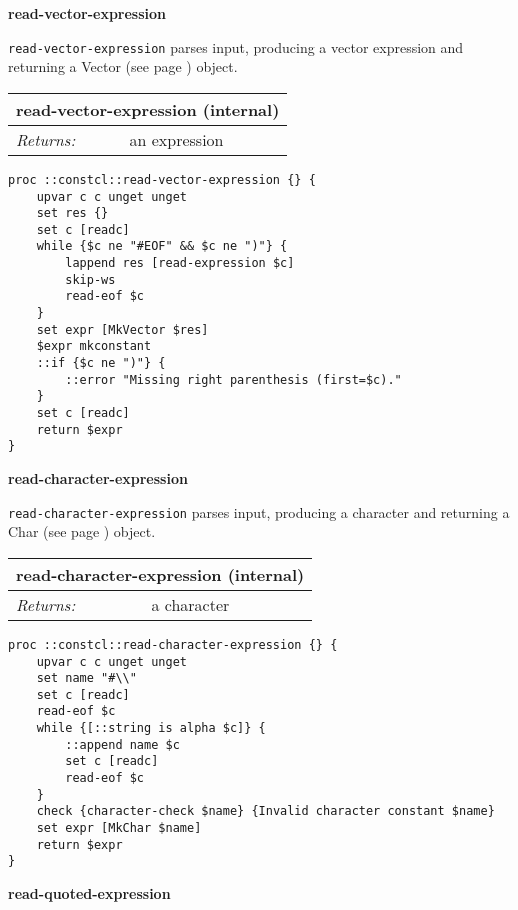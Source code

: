 \documentclass{report}
\begin{document}
\textbf{read-vector-expression}


\texttt{read-vector-expression} parses input, producing a vector expression and returning a Vector (see page \pageref{vectors}) object.

\begin{tabular}{ |l l| }
\hline
\multicolumn{2}{|l|}{read-vector-expression (internal)} \\
\hline
\textit{Returns:} & an expression \\
\hline
\end{tabular}

\noindent\makebox[\linewidth]{\rule{\linewidth}{0.4pt}}
\begin{lstlisting}
proc ::constcl::read-vector-expression {} {
    upvar c c unget unget
    set res {}
    set c [readc]
    while {$c ne "#EOF" && $c ne ")"} {
        lappend res [read-expression $c]
        skip-ws
        read-eof $c
    }
    set expr [MkVector $res]
    $expr mkconstant
    ::if {$c ne ")"} {
        ::error "Missing right parenthesis (first=$c)."
    }
    set c [readc]
    return $expr
}
\end{lstlisting}
\noindent\makebox[\linewidth]{\rule{\linewidth}{0.4pt}}

\textbf{read-character-expression}


\texttt{read-character-expression} parses input, producing a character and returning a Char (see page \pageref{characters}) object.

\begin{tabular}{ |l l| }
\hline
\multicolumn{2}{|l|}{read-character-expression (internal)} \\
\hline
\textit{Returns:} & a character \\
\hline
\end{tabular}

\noindent\makebox[\linewidth]{\rule{\linewidth}{0.4pt}}
\begin{lstlisting}
proc ::constcl::read-character-expression {} {
    upvar c c unget unget
    set name "#\\"
    set c [readc]
    read-eof $c
    while {[::string is alpha $c]} {
        ::append name $c
        set c [readc]
        read-eof $c
    }
    check {character-check $name} {Invalid character constant $name}
    set expr [MkChar $name]
    return $expr
}
\end{lstlisting}
\noindent\makebox[\linewidth]{\rule{\linewidth}{0.4pt}}

\textbf{read-quoted-expression}
\end{document}
